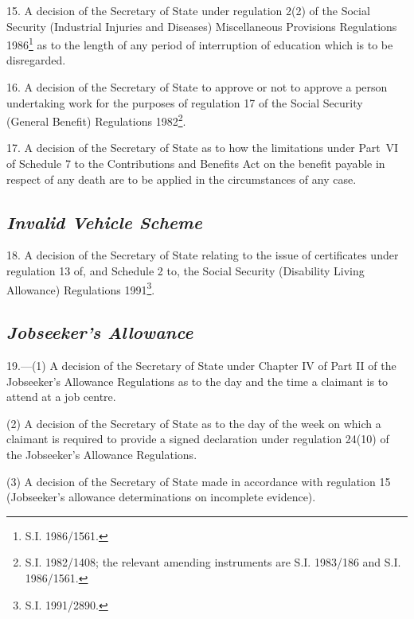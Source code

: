 \documentclass[12pt,a4paper]{article}
\begin{document}
\medskip

15.  A decision of the Secretary of State under regulation 2(2) of the Social Security (Industrial Injuries and Diseases) Miscellaneous Provisions Regulations 1986\footnote{\frenchspacing S.I. 1986/1561.} as to the length of any period of interruption of education which is to be disregarded.

\medskip

16.  A decision of the Secretary of State to approve or not to approve a person undertaking work for the purposes of regulation 17 of the Social Security (General Benefit) Regulations 1982\footnote{\frenchspacing S.I. 1982/1408; the relevant amending instruments are S.I. 1983/186 and S.I. 1986/1561.}.

\medskip

17.  A decision of the Secretary of State as to how the limitations under Part~VI of Schedule 7 to the Contributions and Benefits Act on the benefit payable in respect of any death are to be applied in the circumstances of any case.

\subsection*{\itshape Invalid Vehicle Scheme}

18.  A decision of the Secretary of State relating to the issue of certificates under regulation 13 of, and Schedule 2 to, the Social Security (Disability Living Allowance) Regulations 1991\footnote{\frenchspacing S.I. 1991/2890.}.

\subsection*{\itshape Jobseeker’s Allowance}

19.—(1) A decision of the Secretary of State under Chapter IV of Part II of the Jobseeker’s Allowance Regulations as to the day and the time a claimant is to attend at a job centre.

(2) A decision of the Secretary of State as to the day of the week on which a claimant is required to provide a signed declaration under regulation 24(10) of the Jobseeker’s Allowance Regulations.

(3) A decision of the Secretary of State 
made in accordance with regulation 15 (Jobseeker’s allowance determinations on incomplete evidence).
\end{document}
